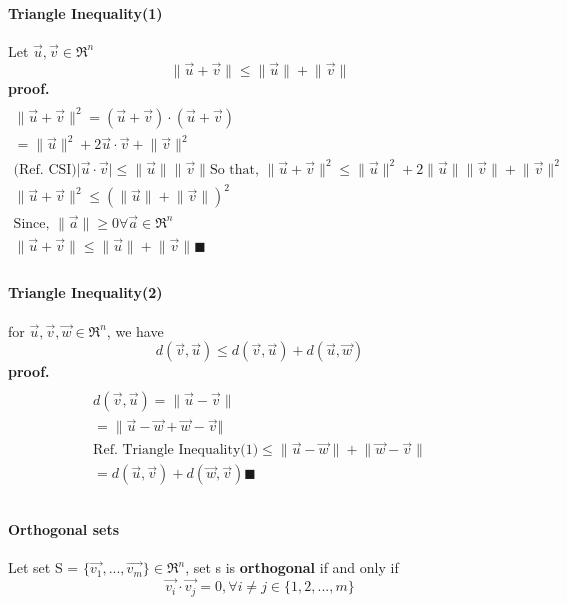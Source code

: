 \documentclass{article}
\begin{document}
	\paragraph{Triangle Inequality(1)} Let $\vec{u},\vec{v} \in \Re^n$
		\[ \lVert \vec{u} + \vec{v} \rVert \leq \lVert \vec{u} \rVert + \lVert \vec{v} \rVert
		\]		
	\newline \textbf{proof.}
	\begin{multline}
		\\
		\lVert \vec{u} + \vec{v} \rVert ^ 2 = (\vec{u} + \vec{v}) \cdot (\vec{u} + \vec{v})
		\\
		= \lVert \vec{u} \rVert^2 + 2 \vec{u}\cdot\vec{v} + \lVert\vec{v}\rVert^2
		\\
		\text{(Ref. CSI)} \lvert \vec{u} \cdot \vec{v} \rvert \leq \lVert\vec{u}\rVert \lVert\vec{v}\rVert
		\text{So that, } \lVert \vec{u} + \vec{v} \rVert ^ 2 \leq \lVert \vec{u} \rVert ^ 2 + 2 \lVert \vec{u} \rVert \lVert \vec{v} \rVert + \lVert \vec{v}\rVert ^ 2
		\\
		\lVert \vec{u} + \vec{v} \rVert ^ 2 \leq (\lVert\vec{u}\rVert + \lVert\vec{v}\rVert) ^ 2
		\\
		\text{Since, } \lVert\vec{a}\rVert \geq 0 \forall \vec{a} \in \Re^n
		\\
		\lVert \vec{u} + \vec{v} \rVert \leq \lVert \vec{u} \rVert + \lVert \vec{v} \rVert \blacksquare
		\\
	\end{multline}
	\paragraph{Triangle Inequality(2)} for $\vec{u},\vec{v},\vec{w} \in \Re^n$, we have
	\[
		d(\vec{v},\vec{u}) \leq d(\vec{v},\vec{u}) + d(\vec{u},\vec{w})
	\]
	\newline	 \textbf{proof.}
	\begin{multline}
		\\
		d(\vec{v},\vec{u}) = \lVert \vec{u} - \vec{v} \rVert \\
		= \lVert \vec{u} - \vec{w} + \vec{w} - \vec{v} \Vert \\
		\text{Ref. Triangle Inequality(1)} \leq \lVert \vec{u} - \vec{w} \rVert + \lVert \vec{w} - \vec{v} \rVert \\
		= d(\vec{u},\vec{v}) + d(\vec{w},\vec{v}) \blacksquare \\
		\\
	\end{multline}
	\paragraph{Orthogonal sets} Let set S = $\{\vec{v_1},...,\vec{v_m}\}\in \Re^n$, set s is \textbf{orthogonal} if and only if
	\[ \vec{v_i} \cdot \vec{v_j} = 0, \forall i \neq j \in \{1,2,...,m\}
	\]
\end{document}
